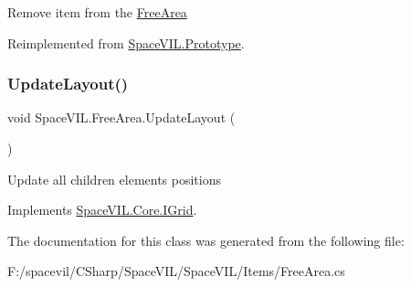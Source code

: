 Remove item from the \mbox{\hyperlink{class_space_v_i_l_1_1_free_area}{Free\+Area}} 



Reimplemented from \mbox{\hyperlink{class_space_v_i_l_1_1_prototype_a7a2aabccfe6389f71d0265fa73f0ae87}{Space\+V\+I\+L.\+Prototype}}.

\mbox{\label{class_space_v_i_l_1_1_free_area_a88f3dc2645275f25f2fae769e7a1423a}} 
\subsubsection{\texorpdfstring{Update\+Layout()}{UpdateLayout()}}
{\footnotesize\ttfamily void Space\+V\+I\+L.\+Free\+Area.\+Update\+Layout (\begin{DoxyParamCaption}{ }\end{DoxyParamCaption})}



Update all children elements positions 



Implements \mbox{\hyperlink{interface_space_v_i_l_1_1_core_1_1_i_grid}{Space\+V\+I\+L.\+Core.\+I\+Grid}}.



The documentation for this class was generated from the following file\+:\begin{DoxyCompactItemize}
\item 
F\+:/spacevil/\+C\+Sharp/\+Space\+V\+I\+L/\+Space\+V\+I\+L/\+Items/Free\+Area.\+cs\end{DoxyCompactItemize}
